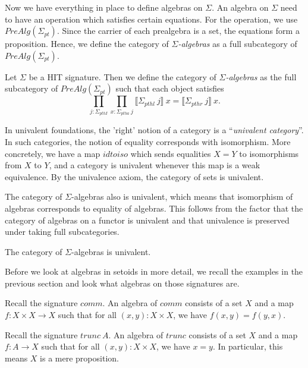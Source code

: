 \documentclass[9pt]{entcs}
\newcommand{\category}[1]{#1}
\newcommand{\function}[1]{#1}
\newcommand{\deprod}[3]{\prod_{#1 : #2} #3}
\newcommand{\1}{\type{1}} %
\newcommand{\idtoiso}{\function{idtoiso}}
\newcommand{\pt}[0]{pt}
\newcommand{\pthI}[0]{pthI}
\newcommand{\pthA}[0]{ptha}
\newcommand{\pthlh}[0]{pthl}
\newcommand{\pthrh}[0]{pthr}
\newcommand{\pointc}[1]{#1_{\pt}} %
\newcommand{\pathI}[1]{#1_{\pthI}} %
\newcommand{\pathA}[1]{#1_{\pthA}} %
\newcommand{\pathlh}[1]{#1_{\pthlh}} %
\newcommand{\pathrh}[1]{#1_{\pthrh}} %
\newcommand{\comm}{comm}
\newcommand{\trunc}{trunc}
\newcommand{\prealg}[1]{\category{PreAlg}(#1)} %
\newcommand{\semE}[1]{\llbracket #1 \rrbracket} %
\begin{document}
Now we have everything in place to define algebras on $\Sigma$.
An algebra on $\Sigma$ need to have an operation which satisfies certain equations.
For the operation, we use $\prealg{\pointc{\Sigma}}$.
Since the carrier of each prealgebra is a set, the equations form a proposition.
Hence, we define the category of \emph{$\Sigma$-algebras} as a full subcategory of $\prealg{\pointc{\Sigma}}$.

\begin{definition}
Let $\Sigma$ be a HIT signature.
Then we define the category of \emph{$\Sigma$-algebras} as the full subcategory of $\prealg{\pointc{\Sigma}}$ such that each object satisfies
\[
\deprod{j}{\pathI{\Sigma}}{\deprod{x}{\pathA{\Sigma} \> j}{\semE{\pathlh{\Sigma} \> j} \> x = \semE{\pathrh{\Sigma} \> j} \> x}}.
\]
\end{definition}

In univalent foundations, the 'right' notion of a category is a ``\emph{univalent category}''.
In such categories, the notion of equality corresponds with isomorphism.
More concretely, we have a map $\idtoiso$ which sends equalities $X = Y$ to isomorphisms from $X$ to $Y$, and a category is univalent whenever this map is a weak equivalence.
By the univalence axiom, the category of sets is univalent.

The category of $\Sigma$-algebras also is univalent, which means that isomorphism of algebras corresponds to equality of algebras.
This follows from the factor that the category of algebras on a functor is univalent and that univalence is preserved under taking full subcategories.

\begin{proposition}
The category of $\Sigma$-algebras is univalent.
\end{proposition}

Before we look at algebras in setoids in more detail, we recall the examples in the previous section and look what algebras on those signatures are.

\begin{example}
Recall the signature $\comm$.
An algebra of $\comm$ consists of a set $X$ and a map $f : X \times X \rightarrow X$ such that for all $(x , y) : X \times X$, we have $f(x, y) = f(y, x)$.
\end{example}

\begin{example}
Recall the signature $\trunc \> A$.
An algebra of $\trunc$ consists of a set $X$ and a map $f : A \rightarrow X$ such that for all $(x , y) : X \times X$, we have $x = y$.
In particular, this means $X$ is a mere proposition.
\end{example}
\end{document}
